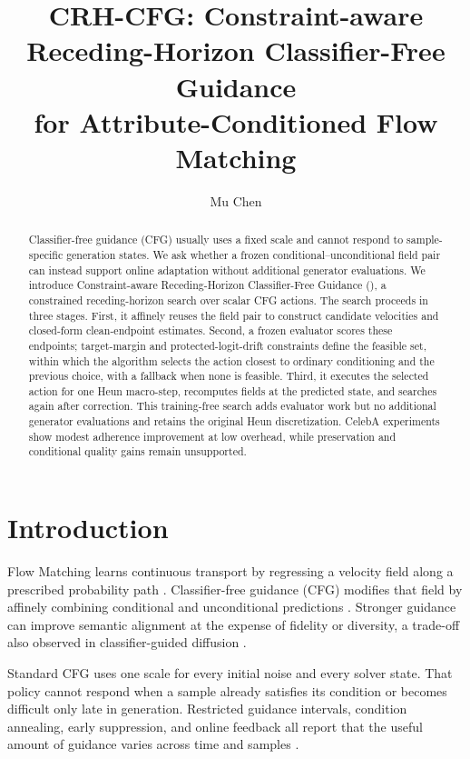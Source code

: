 \documentclass[10pt,twocolumn,letterpaper]{article}
\title{CRH-CFG: Constraint-aware Receding-Horizon Classifier-Free Guidance\\
for Attribute-Conditioned Flow Matching}
\author{Mu Chen}
\begin{document}
\maketitle

\begin{abstract}
Classifier-free guidance (CFG) usually uses a fixed scale and cannot respond to
sample-specific generation states. We ask whether a frozen
conditional--unconditional field pair can instead support online adaptation
without additional generator evaluations. We introduce Constraint-aware
Receding-Horizon Classifier-Free Guidance (\method), a constrained
receding-horizon search over scalar CFG actions. The search proceeds in three
stages. First, it affinely reuses the field pair to
construct candidate velocities and closed-form clean-endpoint estimates.
Second, a frozen evaluator scores these endpoints; target-margin and
protected-logit-drift constraints define the feasible set, within which the
algorithm selects the action closest to ordinary conditioning and the previous
choice, with a fallback when none is feasible. Third, it executes the selected
action for one Heun macro-step, recomputes fields at the predicted state, and
searches again after correction. This training-free search adds evaluator work
but no additional generator evaluations and retains the original Heun discretization.
CelebA experiments show modest adherence improvement at low overhead, while
preservation and conditional quality gains remain unsupported.
\end{abstract}

\section{Introduction}

Flow Matching learns continuous transport by regressing a velocity field along
a prescribed probability path \cite{lipman2023flow}. Classifier-free guidance
(CFG) modifies that field by affinely combining conditional and unconditional
predictions \cite{ho2022classifierfree,zheng2023guided}. Stronger guidance can
improve semantic alignment at the expense of fidelity or diversity, a trade-off
also observed in classifier-guided diffusion \cite{dhariwal2021diffusion}.

Standard CFG uses one scale for every initial noise and every solver state.
That policy cannot respond when a sample already satisfies its condition or
becomes difficult only late in generation. Restricted guidance intervals,
condition annealing, early suppression, and online feedback all report that
the useful amount of guidance varies across time and samples
\cite{kynkaanniemi2024applying,sadat2024cads,fan2025cfgzerostar,papalampidi2025dynamic}.
\end{document}
